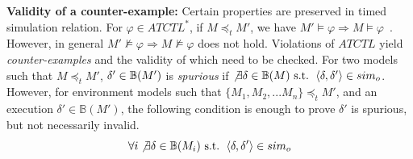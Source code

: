 \textbf{Validity of a counter-example: }
Certain properties are preserved in timed simulation relation. For $\varphi\in ATCTL^*$, if $M\preceq_t M'$, we have $M'\models \varphi\Rightarrow M\models\varphi$~\cite{CEGAR}. However, in general $M'\not\models \varphi\Rightarrow M\not\models\varphi$ does not hold. Violations of $ATCTL$ yield \emph{counter-examples} and the validity of which need to be checked.
For two models such that $M\preceq_t M'$, $\delta'\in\mathbb{B}{(M')}$ is \emph{spurious} if $\not\exists \delta\in\mathbb{B}(M) \text{ s.t. }\left\langle\delta,\delta'\right\rangle\in sim_o$.
However, for environment models such that $\{M_1,M_2,...M_n\}\preceq_t M'$, and an execution $\delta'\in\mathbb{B}(M')$, the following condition is enough to prove $\delta'$ is spurious, but not necessarily invalid.
$$\forall i\not\exists \delta\in\mathbb{B}(M_i)\text{ s.t. }\left\langle\delta,\delta'\right\rangle\in sim_o$$
\vspace{-15pt}

